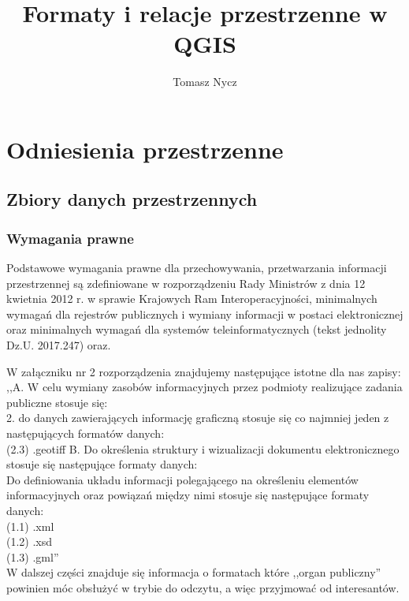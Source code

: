 \documentclass[a4paper,11pt, onecolumn, openany]{memoir}
\author{Tomasz Nycz}
\title{Formaty i relacje przestrzenne w QGIS}
\begin{document}
	\frontmatter

	\maketitle


\mainmatter
\part{Odniesienia przestrzenne}
	\chapter{Zbiory danych przestrzennych}
		\section{Wymagania prawne}
		Podstawowe wymagania prawne dla przechowywania, przetwarzania informacji przestrzennej są zdefiniowane w rozporządzeniu
Rady Ministrów z dnia 12 kwietnia 2012 r. w sprawie Krajowych Ram Interoperacyjności, minimalnych wymagań dla rejestrów publicznych i wymiany informacji w postaci elektronicznej oraz minimalnych wymagań dla systemów teleinformatycznych (tekst jednolity Dz.U. 2017.247) oraz.


		W załączniku nr 2 rozporządzenia znajdujemy następujące istotne dla nas zapisy:  
		,,A. W celu wymiany zasobów informacyjnych przez podmioty realizujące zadania publiczne stosuje się:\\
		2. do danych zawierających informację graficzną stosuje się co najmniej jeden z następujących formatów danych:\\
		(2.3) .geotiff
		B. Do określenia struktury i wizualizacji dokumentu elektronicznego stosuje się następujące formaty danych:\\
		Do definiowania układu informacji polegającego na określeniu elementów informacyjnych oraz powiązań między nimi stosuje się następujące formaty danych:\\
		(1.1) .xml\\
		(1.2) .xsd\\
		(1.3) .gml''\\
	W dalszej części znajduje się informacja o formatach które ,,organ publiczny'' powinien móc obsłużyć w trybie do odczytu, a więc przyjmować od interesantów. 	
\end{document}
